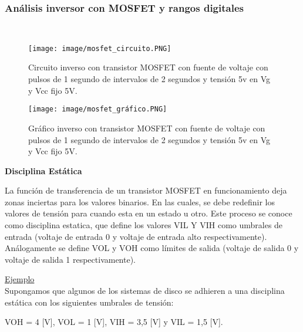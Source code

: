 \documentclass[11pt,fancy,lang=es]{elegantbook}
\begin{document}
    \subsubsection{Análisis inversor con MOSFET y rangos digitales}\\
    \begin{center}
        \begin{figure}
            \label{Vf}
            \texttt{[image: image/mosfet\_circuito.PNG]}
            \caption{Circuito inverso con transistor MOSFET con fuente de voltaje con pulsos de 1 segundo de intervalos de 2 segundos y tensión 5v en Vg y Vcc fijo 5V.}
            \label{fig:CM}
        \end{figure}
    \end{center}
    \begin{center}
        \begin{figure}
            \label{Vf}
            \texttt{[image: image/mosfet\_gráfico.PNG]}
            \caption{Gráfico inverso con transistor MOSFET con fuente de voltaje con pulsos de 1 segundo de intervalos de 2 segundos y tensión 5v en Vg y Vcc fijo 5V.}
            \label{fig:GM}
        \end{figure}
    \end{center}
    \begin{center}
        \textbf{Disciplina Estática}\\
    \end{center}
    {La función de transferencia  de un transistor MOSFET en funcionamiento deja zonas inciertas para los valores binarios. En las cuales, se debe redefinir los valores de tensión para cuando esta  en un  estado u otro. Este proceso se conoce como disciplina estatica, que define los valores VIL Y VIH como umbrales de entrada (voltaje de entrada 0 y voltaje de entrada alto respectivamente). Análogamente se define VOL y VOH como límites  de salida (voltaje de salida 0 y voltaje de salida 1 respectivamente).}

    \underline{Ejemplo}\\
    {Supongamos que algunos de los sistemas de disco se adhieren a una disciplina estática con los siguientes umbrales de tensión:}\\

    \begin{center}
        {VOH = 4 [V], VOL = 1 [V], VIH = 3,5 [V] y VIL = 1,5 [V].}
    \end{center}\\
\end{document}
